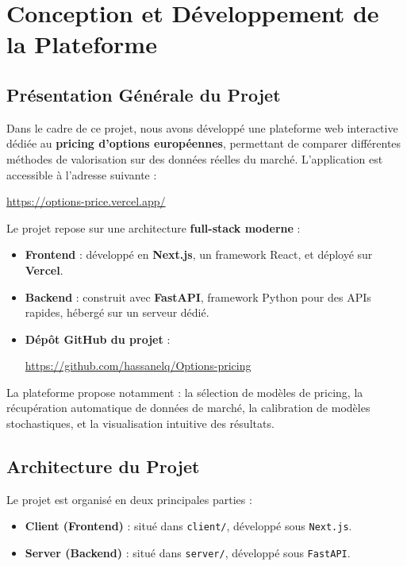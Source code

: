 \chapter{Conception et Développement de la Plateforme} \label{chap:implementation}

\section{Présentation Générale du Projet}

Dans le cadre de ce projet, nous avons développé une plateforme web interactive dédiée au \textbf{pricing d'options européennes}, permettant de comparer différentes méthodes de valorisation sur des données réelles du marché. L'application est accessible à l'adresse suivante :

\begin{center} \url{https://options-price.vercel.app/} \end{center}

Le projet repose sur une architecture \textbf{full-stack moderne} :

\begin{itemize} \item \textbf{Frontend} : développé en \textbf{Next.js}, un framework React, et déployé sur \textbf{Vercel}. \item \textbf{Backend} : construit avec \textbf{FastAPI}, framework Python pour des APIs rapides, hébergé sur un serveur dédié. \item \textbf{Dépôt GitHub du projet} : \begin{center} \url{https://github.com/hassanelq/Options-pricing} \end{center} \end{itemize}

La plateforme propose notamment : la sélection de modèles de pricing, la récupération automatique de données de marché, la calibration de modèles stochastiques, et la visualisation intuitive des résultats.

\section{Architecture du Projet}

Le projet est organisé en deux principales parties :

\begin{itemize} \item \textbf{Client (Frontend)} : situé dans \texttt{client/}, développé sous \texttt{Next.js}. \item \textbf{Server (Backend)} : situé dans \texttt{server/}, développé sous \texttt{FastAPI}. \end{itemize}

